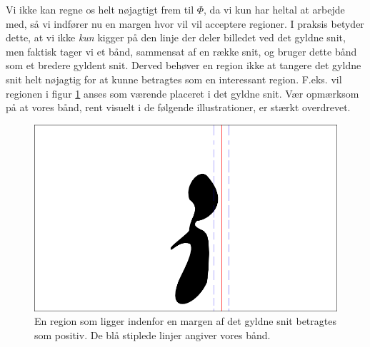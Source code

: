 {Vi ikke kan regne os helt nøjagtigt frem til $\varPhi$, da vi
kun har heltal at arbejde med, så vi indfører nu en margen hvor vil vil
acceptere regioner. I praksis betyder dette, at vi ikke \emph{kun} kigger
på den linje der deler billedet ved det gyldne snit, men faktisk tager
vi et bånd, sammensat af en række snit, og bruger dette bånd som et
bredere gyldent snit.  Derved behøver en region ikke at tangere det
gyldne snit helt nøjagtig for at kunne betragtes som en interessant
region. F.eks. vil regionen i figur \ref{pos_naiv_margin_1} anses som
værende placeret i det gyldne snit. Vær opmærksom på at vores bånd,
rent visuelt i de følgende illustrationer, er stærkt overdrevet.
\begin{figure}[h]
	\begin{center}
		\includegraphics[scale=\imgscale,angle=0]{afsnit/vores_implementation/billeder/naiv_algoritme/naiv_positiv_blob_margin_1}
	\end{center}
	\caption[Positiv region i margen]{En region som
	ligger indenfor en margen af det gyldne snit betragtes som
	positiv. De blå stiplede linjer angiver vores bånd.}
	\label{pos_naiv_margin_1}
\end{figure}

}
